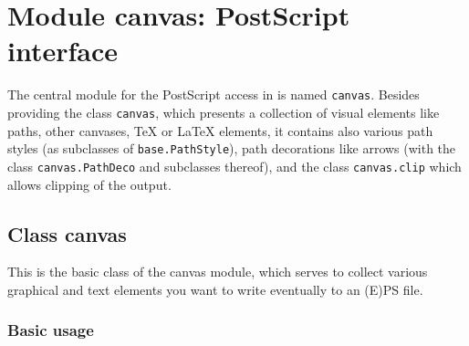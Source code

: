 \chapter{Module canvas: PostScript interface}

\label{canvas}

The central module for the PostScript access in \PyX{} is named
\verb|canvas|. Besides providing the class \verb|canvas|, which
presents a collection of visual elements like paths, other canvases,
\TeX{} or \LaTeX{} elements, it contains also various path styles (as
subclasses of \texttt{base.PathStyle}), path decorations like arrows
(with the class \texttt{canvas.PathDeco} and subclasses thereof), and
the class \texttt{canvas.clip} which allows clipping of the output.


\section{Class canvas}

This is the basic class of the canvas module, which serves to collect
various graphical and text elements you want to write eventually to an 
(E)PS file. 

\subsection{Basic usage}

